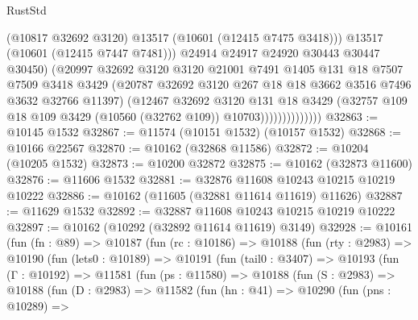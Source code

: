 \begin{lexlean}{RustStd}
\begin{coremodule}
                                (@10817 @32692 @3120)
                                @13517
                                (@10601 (@12415 @7475 @3418)))
                              @13517
                              (@10601 (@12415 @7447 @7481)))
                            @24914
                            @24917
                            @24920
                            @30443
                            @30447
                            @30450)
                          (@20997
                            @32692
                            @3120
                            @3120
                            @21001
                            @7491
                            @1405
                            @131
                            @18
                            @7507
                            @7509
                            @3418
                            @3429
                            (@20787 @32692 @3120 @267 @18 @18 @3662 @3516 @7496 @3632 @32766 @11397)
                            (@12467
                              @32692
                              @3120
                              @131
                              @18
                              @3429
                              (@32757
                                @109
                                @18
                                @109
                                @3429
                                (@10560 (@32762 @109))
                                @10703))))))))))))))
@32863 := @10145 @1532
@32867 := @11574 (@10151 @1532) (@10157 @1532)
@32868 := @10166 @22567
@32870 := @10162 (@32868 @11586)
@32872 := @10204 (@10205 @1532)
@32873 := @10200 @32872
@32875 := @10162 (@32873 @11600)
@32876 := @11606 @1532
@32881 := @32876 @11608 @10243 @10215 @10219 @10222
@32886 := @10162 (@11605 (@32881 @11614 @11619) @11626)
@32887 := @11629 @1532
@32892 := @32887 @11608 @10243 @10215 @10219 @10222
@32897 := @10162 (@10292 (@32892 @11614 @11619) @3149)
@32928 := @10161
    (fun (fn : @89) =>
    @10187
      (fun (rc : @10186) =>
      @10188
        (fun (rty : @2983) =>
        @10190
          (fun (lets0 : @10189) =>
          @10191
            (fun (tail0 : @3407) =>
            @10193
              (fun (Γ : @10192) =>
              @11581
                (fun (ps : @11580) =>
                @10188
                  (fun (S : @2983) =>
                  @10188
                    (fun (D : @2983) =>
                    @11582
                      (fun (hn : @41) =>
                      @10290
                        (fun (pns : @10289) =>

\end{coremodule}
\end{lexlean}
